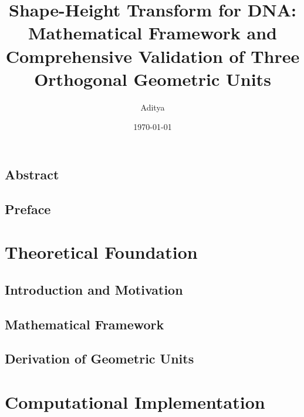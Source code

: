 \documentclass[12pt,oneside,a4paper]{book}
\title{Shape-Height Transform for DNA:\\[0.5cm] \Large Mathematical Framework and Comprehensive Validation of Three Orthogonal Geometric Units}
\author{Aditya}
\date{\today}
\begin{document}
\frontmatter

\maketitle

\chapter*{Abstract}


\tableofcontents
\listoffigures
\listoftables

\chapter*{Preface}



\mainmatter

\part{Theoretical Foundation}

\chapter{Introduction and Motivation}


\chapter{Mathematical Framework}


\chapter{Derivation of Geometric Units}



\part{Computational Implementation}
\end{document}
